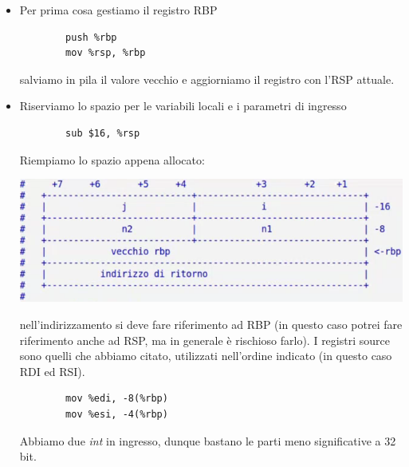 \begin{itemize}
	\item Per prima cosa gestiamo il registro RBP 
	\begin{verbatim}
		push %rbp
		mov %rsp, %rbp
	\end{verbatim}
	salviamo in pila il valore vecchio e aggiorniamo il registro con l'RSP attuale.
	\item Riserviamo lo spazio per le variabili locali e i parametri di ingresso
	\begin{verbatim}
		sub $16, %rsp
	\end{verbatim}
	Riempiamo lo spazio appena allocato:
	\begin{center}
		\includegraphics[scale=.85]{img/33.PNG}
	\end{center} 
	nell'indirizzamento si deve fare riferimento ad RBP (in questo caso potrei fare riferimento anche ad RSP, ma in generale è rischioso farlo). I registri source sono quelli che abbiamo citato, utilizzati nell'ordine indicato (in questo caso RDI ed RSI). 
	\begin{verbatim}
		mov %edi, -8(%rbp)
		mov %esi, -4(%rbp)
	\end{verbatim}
	Abbiamo due \emph{int} in ingresso, dunque bastano le parti meno significative a 32 bit.
\end{itemize}
